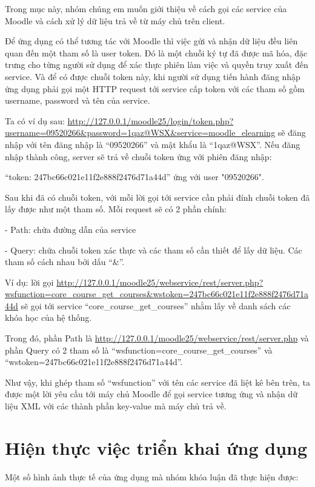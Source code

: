 Trong mục này, nhóm chúng em muốn giới thiệu về cách gọi các service của Moodle và cách xử lý dữ liệu trả về từ máy chủ trên client.

Để ứng dụng có thể tương tác với Moodle thì việc gửi và nhận dữ liệu đều liên quan đến một tham số là user token. Đó là một chuỗi ký tự đã được mã hóa, đặc trưng cho từng người sử dụng để xác thực phiên làm việc và quyền truy xuất đến service. Và để có được chuỗi token này, khi người sử dụng tiến hành đăng nhập ứng dụng phải gọi một HTTP request tới service cấp token với các tham số gồm username, password và tên của service.

Ta có ví dụ sau: \url{http://127.0.0.1/moodle25/login/token.php?username=09520266\&password=1qaz@WSX&service=moodle_elearning} sẽ đăng nhập với tên đăng nhập là “09520266” và mật khẩu là “1qaz@WSX”. Nếu đăng nhập thành công, server sẽ trả về chuỗi token ứng với phiên đăng nhập: 

“token: 247bc66c021e11f2e888f2476d71a44d” ứng với user "09520266".

Sau khi đã có chuỗi token, với mỗi lời gọi tới service cần phải đính chuỗi token đã lấy được như một tham số. Mỗi request sẽ có 2 phần chính:

\quad - Path: chứa đường dẫn của service

\quad - Query: chứa chuỗi token xác thực và các tham số cần thiết để lấy dữ liệu. Các tham số cách nhau bởi dấu “\&”.

Ví dụ: lời gọi \url{http://127.0.0.1/moodle25/webservice/rest/server.php?wsfunction=core_course_get_courses&wstoken=247bc66c021e11f2e888f2476d71a44d} sẽ gọi tới service “core\_course\_get\_courses” nhằm lấy về danh sách các khóa học của hệ thống. 

Trong đó, phần Path là \url{http://127.0.0.1/moodle25/webservice/rest/server.php} và phần Query có 2 tham số là “wsfunction=core\_course\_get\_courses” và “wstoken=247bc66c021e11f2e888f2476d71a44d”.

Như vậy, khi ghép tham số “wsfunction” với tên các service đã liệt kê bên trên, ta được một lời yêu cầu tới máy chủ Moodle để gọi service tương ứng và nhận dữ liệu XML với các thành phần key-value mà máy chủ trả về.


\section{Hiện thực việc triển khai ứng dụng}
Một số hình ảnh thực tế của ứng dụng mà nhóm khóa luận đã thực hiện được:

